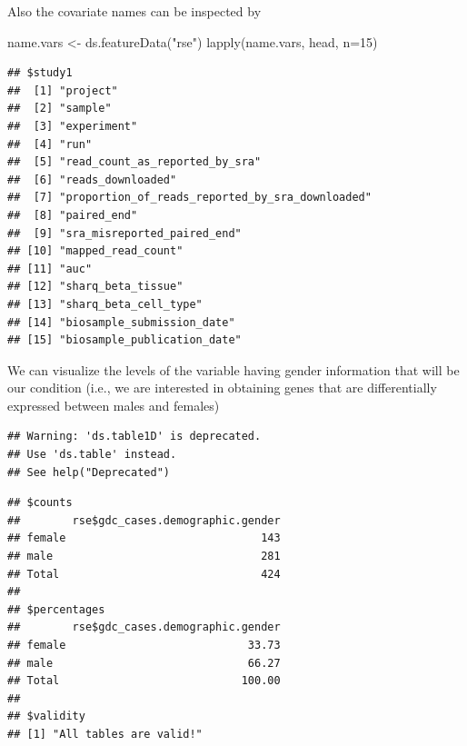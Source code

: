 \documentclass[
]{book}
\newenvironment{Shaded}{\begin{snugshade}}{\end{snugshade}}
\newcommand{\AttributeTok}[1]{\textcolor[rgb]{0.77,0.63,0.00}{#1}}
\newcommand{\DecValTok}[1]{\textcolor[rgb]{0.00,0.00,0.81}{#1}}
\newcommand{\FunctionTok}[1]{\textcolor[rgb]{0.00,0.00,0.00}{#1}}
\newcommand{\NormalTok}[1]{#1}
\newcommand{\OtherTok}[1]{\textcolor[rgb]{0.56,0.35,0.01}{#1}}
\newcommand{\StringTok}[1]{\textcolor[rgb]{0.31,0.60,0.02}{#1}}
\begin{document}
Also the covariate names can be inspected by

\begin{Shaded}
\begin{Highlighting}[]
\NormalTok{name.vars }\OtherTok{\textless{}{-}} \FunctionTok{ds.featureData}\NormalTok{(}\StringTok{"rse"}\NormalTok{)}
\FunctionTok{lapply}\NormalTok{(name.vars, head, }\AttributeTok{n=}\DecValTok{15}\NormalTok{)}
\end{Highlighting}
\end{Shaded}

\begin{verbatim}
## $study1
##  [1] "project"                                       
##  [2] "sample"                                        
##  [3] "experiment"                                    
##  [4] "run"                                           
##  [5] "read_count_as_reported_by_sra"                 
##  [6] "reads_downloaded"                              
##  [7] "proportion_of_reads_reported_by_sra_downloaded"
##  [8] "paired_end"                                    
##  [9] "sra_misreported_paired_end"                    
## [10] "mapped_read_count"                             
## [11] "auc"                                           
## [12] "sharq_beta_tissue"                             
## [13] "sharq_beta_cell_type"                          
## [14] "biosample_submission_date"                     
## [15] "biosample_publication_date"
\end{verbatim}

We can visualize the levels of the variable having gender information that will be our condition (i.e., we are interested in obtaining genes that are differentially expressed between males and females)

\begin{Shaded}
\end{Shaded}

\begin{verbatim}
## Warning: 'ds.table1D' is deprecated.
## Use 'ds.table' instead.
## See help("Deprecated")
\end{verbatim}

\begin{verbatim}
## $counts
##        rse$gdc_cases.demographic.gender
## female                              143
## male                                281
## Total                               424
## 
## $percentages
##        rse$gdc_cases.demographic.gender
## female                            33.73
## male                              66.27
## Total                            100.00
## 
## $validity
## [1] "All tables are valid!"
\end{verbatim}
\end{document}
